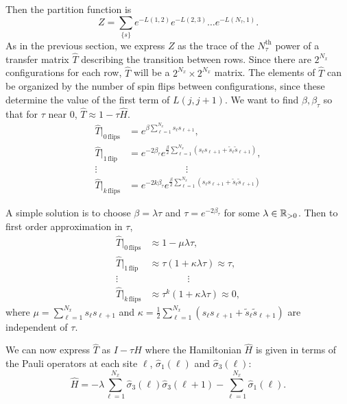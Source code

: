 \documentclass[11pt,reqno]{amsart}
\begin{document}
	Then the partition function is 
	\[ Z=\sum_{\{s\}} e^{-L(1,2)}e^{-L(2,3)}\ldots e^{-L(N_\tau,1)}. \]
	As in the previous section, we express $Z$ as the trace of the $N_\tau^\text{th}$ power of a transfer matrix $\hat{T}$ describing the transition between rows. 
	Since there are $2^{N_x}$ configurations for each row, $\hat{T}$ will be a $2^{N_x}\times 2^{N_x}$ matrix.
	The elements of $\hat{T}$ can be organized by the number of spin flips between configurations, since these determine the value of the first term of $L(j,j+1)$. We want to find $\beta,\beta_\tau$ so that for $\tau$ near 0, $\hat{T} \approx 1 - \tau \hat{H}$.
	\begin{align*}
		\hat{T}|_{0\,\text{flips}} &= e^{\beta \sum_{\ell=1}^{N_x} s_{\ell} s_{\ell+1}},  \\		
		\hat{T}|_{1\,\text{flip}} &= e^{-2\beta_\tau} e^{\frac{\beta}{2}\sum_{\ell=1}^{N_x}(s_\ell s_{\ell+1}+\tilde{s}_\ell \tilde{s}_{\ell+1})},\\
		\vdots \quad & \qquad\qquad\qquad \vdots \\		
		\hat{T}|_{k\,\text{flips}} &= e^{-2k\beta_\tau} e^{\frac{\beta}{2}\sum_{\ell=1}^{N_x}(s_\ell s_{\ell+1}+\tilde{s}_\ell \tilde{s}_{\ell+1})}		
	\end{align*}
	
	A simple solution is to choose $\beta =\lambda \tau$ and $\tau = e^{-2\beta_\tau}$ for some $\lambda \in \mathbb{R}_{>0}$.
	Then to first order approximation in $\tau$,
	\begin{align*}
		\hat{T}|_{0\,\text{flips}} &\approx 1-\mu\lambda\tau, \\
		\hat{T}|_{1\,\text{flip}} &\approx \tau (1+\kappa \lambda\tau) \approx \tau, \\
		\vdots \quad & \qquad\qquad \vdots \\		
		\hat{T}|_{k\,\text{flips}} &\approx \tau^k (1+\kappa \lambda\tau) \approx 0, 
	\end{align*}
    where $\mu=\sum_{\ell=1}^{N_x}s_{\ell}s_{\ell+1}$ and $\kappa=\frac{1}{2}\sum_{\ell=1}^{N_x} (s_{\ell}s_{\ell+1}+\tilde{s}_{\ell}\tilde{s}_{\ell+1})$ are independent of $\tau$.
    
    We can now express $\hat{T}$ as $I- \tau \hat{H}$ where the Hamiltonian $\hat{H}$ is given in terms of the Pauli operators at each site $\ell$, $\hat{\sigma}_1(\ell)$ and $\hat{\sigma}_3(\ell)$:
    \begin{equation}\label{eq:1+1IsingHamiltonian}
    \hat{H}= -\lambda \sum_{\ell=1}^{N_x} \hat{\sigma}_3(\ell)\hat{\sigma}_3(\ell+1) - \sum_{\ell=1}^{N_x} \hat{\sigma}_1(\ell). 
    \end{equation}
    
\end{document}
